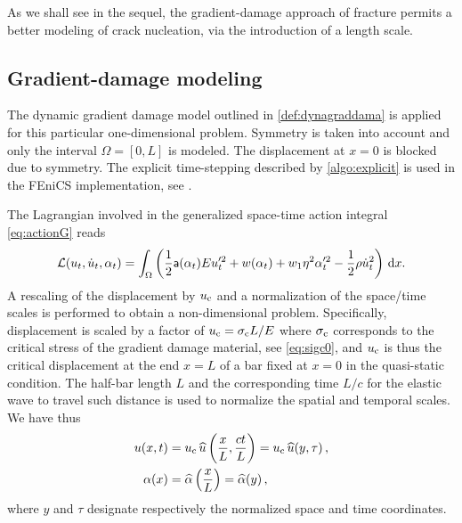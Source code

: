 As we shall see in the sequel, the gradient-damage approach of fracture permits a better modeling of crack nucleation, via the introduction of a length scale.

\subsection{Gradient-damage modeling}
The dynamic gradient damage model outlined in \cref{def:dynagraddama} is applied for this particular one-dimensional problem. Symmetry is taken into account and only the interval $\Omega=[0,L]$ is modeled. The displacement at $x=0$ is blocked due to symmetry. The explicit time-stepping described by \cref{algo:explicit} is used in the FEniCS implementation, see \cite{LiMaurini:2015}.

The Lagrangian involved in the generalized space-time action integral \eqref{eq:actionG} reads
\[
\mathcal{L}(u_t,\dot{u}_t,\alpha_t)=\int_\Omega\left(\frac{1}{2}\mathsf{a}(\alpha_t)Eu_t'^2+w(\alpha_t)+w_1\eta^2\alpha_t'^2-\frac{1}{2}\rho\dot{u}_t^2\right)\,\mathrm{d}x.
\]
A rescaling of the displacement by $u_{\mathrm{c}}$ and a normalization of the space/time scales is performed to obtain a non-dimensional problem. Specifically, displacement is scaled by a factor of $u_{\mathrm{c}}=\sigma_{\mathrm{c}} L/E$ where $\sigma_{\mathrm{c}}$ corresponds to the critical stress of the gradient damage material, see \eqref{eq:sigc0}, and $u_{\mathrm{c}}$ is thus the critical displacement at the end $x=L$ of a bar fixed at $x=0$ in the quasi-static condition. The half-bar length $L$ and the corresponding time $L/c$ for the elastic wave to travel such distance is used to normalize the spatial and temporal scales. We have thus
\begin{align}
u(x,t) &= u_{\mathrm{c}}\,\widehat{u}\left(\frac{x}{L},\frac{ct}{L}\right)=u_{\mathrm{c}}\,\widehat{u}(y,\tau)\,, \label{eq:uhat} \\
\alpha(x) &= \widehat{\alpha}\left(\frac{x}{L}\right)=\widehat{\alpha}(y)\,, \notag
\end{align}
where $y$ and $\tau$ designate respectively the normalized space and time coordinates.

